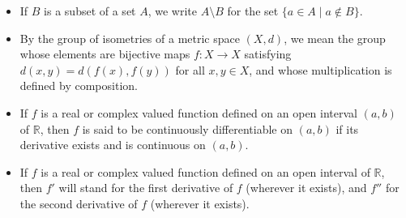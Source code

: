 \documentclass[11pt, a4paper]{article}
\begin{document}
\begin{itemize}
  \item If $B$ is a subset of a set $A$, we write $A \setminus B$ for the set $\{a \in A \mid a \notin B\}$.
  \item By the group of isometries of a metric space $(X, d)$, we mean the group whose elements are bijective maps $f: X \to X$ satisfying $d(x, y) = d(f(x), f(y))$ for all $x, y \in X$, and whose multiplication is defined by composition.
  \item If $f$ is a real or complex valued function defined on an open interval $(a, b)$ of $\mathbb{R}$, then $f$ is said to be continuously differentiable on $(a, b)$ if its derivative exists and is continuous on $(a, b)$.
  \item If $f$ is a real or complex valued function defined on an open interval of $\mathbb{R}$, then $f'$ will stand for the first derivative of $f$ (wherever it exists), and $f''$ for the second derivative of $f$ (wherever it exists).
\end{itemize}
\end{document}
